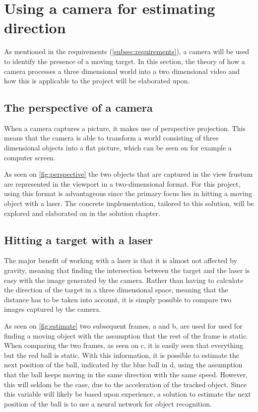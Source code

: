 \section{Using a camera for estimating direction}
As mentioned in the requirements (\autoref{subsec:requirements}), a camera will be used to identify the presence of a moving target.
In this section, the theory of how a camera processes a three dimensional world into a two dimensional video and how this is applicable to the project will be elaborated upon.

\subsection{The perspective of a camera}
When a camera captures a picture, it makes use of perspective projection.
This means that the camera is able to transform a world consisting of three dimensional objects into a flat picture, which can be seen on for example a computer screen.


As seen on \autoref{fig:perspective} the two objects that are captured in the view frustum are represented in the viewport in a two-dimensional format.
For this project, using this format is advantageous since the primary focus lies in hitting a moving object with a laser.
The concrete implementation, tailored to this solution, will be explored and elaborated on in the solution chapter.


\subsection{Hitting a target with a laser}
The major benefit of working with a laser is that it is almost not affected by gravity, meaning that finding the intersection between the target and the laser is easy with the image generated by the camera.
Rather than having to calculate the direction of the target in a three dimensional space, meaning that the distance has to be taken into account, it is simply possible to compare two images captured by the camera.

As seen on \autoref{fig:estimate} two subsequent frames, a and b, are used for used for finding a moving object with the assumption that the rest of the frame is static. 
When comparing the two frames, as seen on c, it is easily seen that everything but the red ball is static.
With this information, it is possible to estimate the next position of the ball, indicated by the blue ball in d, using the assumption that the ball keeps moving in the same direction with the same speed.
However, this will seldom be the case, due to the acceleration of the tracked object.
Since this variable will likely be based upon experience, a solution to estimate the next position of the ball is to use a neural network for object recognition.

